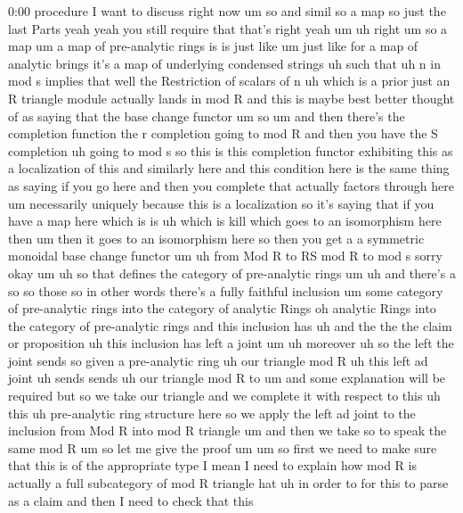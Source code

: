 \begin{unfinished}{0:00}
procedure  I  want  to  discuss  right
now  um  so  and  simil  so  a  map
so  just  the  last  Parts
yeah  yeah  you  still  require  that  that's
right
yeah
um
uh
right  um
so  a  map
um  a  map  of  pre-analytic
rings  is  is  just  like  um  just  like  for  a
map  of  analytic  brings  it's  a  map  of
underlying  condensed  strings
uh  such  that  uh
n  in  mod  s  implies  that  well  the
Restriction  of  scalars  of  n  uh  which  is
a  prior  just  an  R  triangle  module
actually  lands  in  mod  R  and  this  is
maybe  best  better  thought  of  as  saying
that  the  base  change
functor  um
so
um  and  then  there's  the  completion
function
the  r
completion  going  to  mod
R  and  then  you  have  the  S
completion  uh  going  to  mod  s  so  this  is
this  completion  functor  exhibiting  this
as  a  localization  of  this  and  similarly
here  and  this  condition  here  is  the  same
thing  as  saying  if  you  go  here  and  then
you  complete  that  actually  factors
through  here  um  necessarily  uniquely
because  this  is  a  localization  so  it's
saying  that  if  you  have  a  map  here  which
is  is  uh  which  is  kill  which  goes  to  an
isomorphism  here  then
um  then  it  goes  to  an  isomorphism  here
so  then  you  get  a  a  symmetric  monoidal
base  change  functor
um  uh  from  Mod  R  to
RS  mod  R  to  mod  s
sorry
okay
um
uh  so  that  defines  the  category  of
pre-analytic  rings
um  uh  and  there's  a  so  so  those  so  in
other  words  there's  a  fully  faithful
inclusion
um  some  category  of  pre-analytic
rings  into  the  category  of  analytic
Rings  oh  analytic  Rings  into  the
category  of  pre-analytic
rings  and  this  inclusion  has  uh  and  the
the  the  claim  or
proposition  uh  this  inclusion  has  left  a
joint
um  uh
moreover  uh  so  the  left  the  joint  sends
so  given  a  pre-analytic
ring
uh  our  triangle  mod
R  uh  this  left  ad
joint  uh
sends  sends  uh  our  triangle  mod
R  to  um  and  some  explanation  will  be
required  but  so  we  take  our  triangle  and
we  complete  it  with  respect  to  this  uh
this  uh  pre-analytic  ring  structure  here
so  we  apply  the  left  ad  joint  to  the
inclusion  from  Mod  R  into  mod  R  triangle
um  and  then  we  take  so  to  speak  the  same
mod
R
um  so  let  me  give  the  proof
um
um  so  first  we  need  to  make  sure  that
this  is  of  the  appropriate  type  I  mean  I
need  to  explain  how  mod  R  is  actually  a
full  subcategory  of  mod  R  triangle  hat
uh  in  order  to  for  this  to  parse  as  a
claim  and  then  I  need  to  check  that  this

\end{unfinished}
